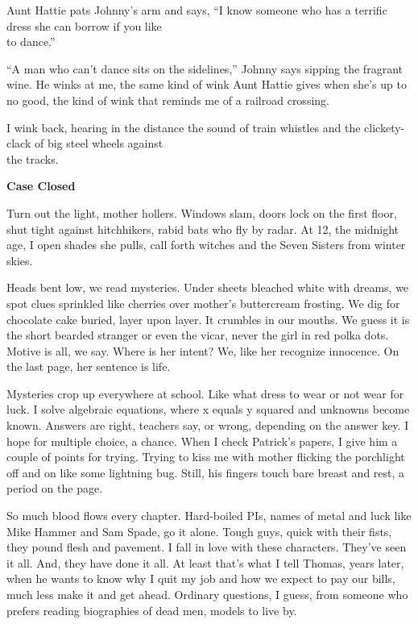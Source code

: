 \documentclass[
]{article}
\begin{document}
Aunt Hattie pats Johnny's arm and says, ``I know someone who has a
terrific dress she can bor­row if you like\\
to dance.''

``A man who can't dance sits on the sidelines,'' Johnny says sipping the
fragrant wine. He winks at me, the same kind of wink Aunt Hattie gives
when she's up to no good, the kind of wink that reminds me of a railroad
crossing.

I wink back, hearing in the distance the sound of train whistles and the
clickety-clack of big steel wheels against\\
the tracks.

\textbf{Case Closed}

Turn out the light, mother hollers. Windows slam, doors lock on the
first floor, shut tight against hitchhikers, rabid bats who fly by
radar. At 12, the midnight age, I open shades she pulls, call forth
witches and the Seven Sisters from winter skies.

Heads bent low, we read mysteries. Under sheets bleached white with
dreams, we spot clues sprinkled like cherries over mother's buttercream
frosting. We dig for chocolate cake buried, layer upon layer. It
crumbles in our mouths. We guess it is the short bearded stranger or
even the vicar, never the girl in red polka dots. Motive is all, we say.
Where is her intent? We, like her recognize innocence. On the last page,
her sentence is life.

Mysteries crop up everywhere at school. Like what dress to wear or not
wear for luck. I solve algebraic equations, where x equals y squared and
unknowns become known. Answers are right, teachers say, or wrong,
depending on the answer key. I hope for multiple choice, a chance. When
I check Patrick's papers, I give him a couple of points for trying.
Trying to kiss me with mother flicking the porchlight off and on like
some lightning bug. Still, his fingers touch bare breast and rest, a
period on the page.

So much blood flows every chapter. Hard-boiled PIs, names of metal and
luck like Mike Hammer and Sam Spade, go it alone. Tough guys, quick with
their fists, they pound flesh and pavement. I fall in love with these
characters. They've seen it all. And, they have done it all. At least
that's what I tell Thomas, years later, when he wants to know why I quit
my job and how we expect to pay our bills, much less make it and get
ahead. Ordinary questions, I guess, from someone who prefers reading
biog­raphies of dead men, models to live by.
\end{document}
